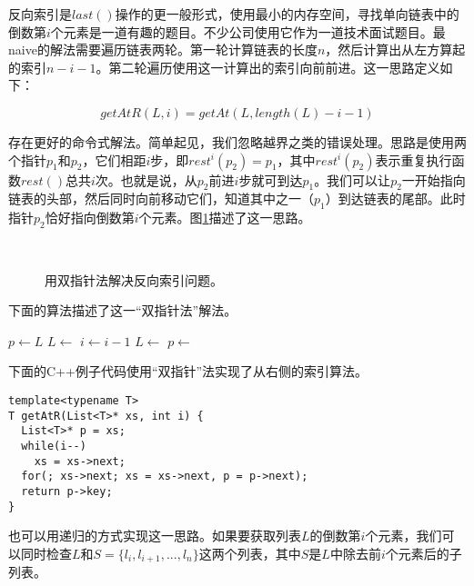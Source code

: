 \documentclass[UTF8]{article}
\begin{document}
反向索引是$last()$操作的更一般形式，使用最小的内存空间，寻找单向链表中的倒数第$i$个元素是一道有趣的题目。不少公司使用它作为一道技术面试题目。最naive的解法需要遍历链表两轮。第一轮计算链表的长度$n$，然后计算出从左方算起的索引$n - i - 1$。第二轮遍历使用这一计算出的索引向前前进。这一思路定义如下：

\[
  getAtR(L, i) = getAt(L, length(L) - i -1)
\]

存在更好的命令式解法。简单起见，我们忽略越界之类的错误处理。思路是使用两个指针$p_1$和$p_2$，它们相距$i$步，即$rest^i(p_2) = p_1$，其中$rest^i(p_2)$表示重复执行函数$rest()$总共$i$次。也就是说，从$p_2$前进$i$步就可到达$p_1$。我们可以让$p_2$一开始指向链表的头部，然后同时向前移动它们，知道其中之一（$p_1$）到达链表的尾部。此时指针$p_2$恰好指向倒数第$i$个元素。图\ref{fig:list-rindex}描述了这一思路。

\begin{figure}[htbp]
    \centering
     \\
    \caption{用双指针法解决反向索引问题。} \label{fig:list-rindex}
\end{figure}

下面的算法描述了这一“双指针法”解法。

\begin{algorithmic}[1]
  \State $p \gets L$
    \State $L \gets $ 
    \State $i \gets i - 1$
  \EndWhile
    \State $L \gets$ 
    \State $p \gets$ 
  \EndWhile
  \State \Return {}
\EndFunction
\end{algorithmic}

下面的C++例子代码使用“双指针”法实现了从右侧的索引算法。

\lstset{language=C++}
\begin{lstlisting}
template<typename T>
T getAtR(List<T>* xs, int i) {
  List<T>* p = xs;
  while(i--)
    xs = xs->next;
  for(; xs->next; xs = xs->next, p = p->next);
  return p->key;
}
\end{lstlisting}

也可以用递归的方式实现这一思路。如果要获取列表$L$的倒数第$i$个元素，我们可以同时检查$L$和$S=\{l_i, l_{i+1}, ..., l_n\}$这两个列表，其中$S$是$L$中除去前$i$个元素后的子列表。
\end{document}
